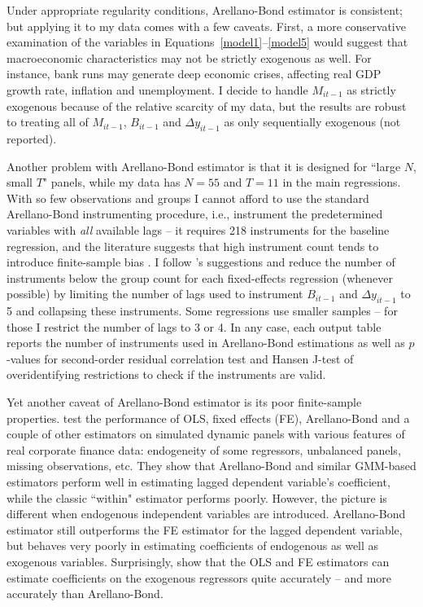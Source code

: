 \documentclass[12pt,a4paper]{article}
\begin{document}
Under appropriate regularity conditions, Arellano-Bond estimator is consistent; but applying it to my data comes with a few caveats. First, a more conservative examination of the variables in Equations~\eqref{model1}--\eqref{model5} would suggest that macroeconomic characteristics may not be strictly exogenous as well. For instance, bank runs may generate deep economic crises, affecting real GDP growth rate, inflation and unemployment. I decide to handle $M_{it-1}$ as strictly exogenous because of the relative scarcity of my data, but the results are robust to treating all of $M_{it-1}$, $B_{it-1}$ and $\Delta y_{it-1}$ as only sequentially exogenous (not reported).

Another problem with Arellano-Bond estimator is that it is designed for ``large $N$, small $T$" panels, while my data has $N = 55$ and $T = 11$ in the main regressions. With so few observations and groups I cannot afford to use the standard Arellano-Bond instrumenting procedure, i.e., instrument the predetermined variables with \emph{all} available lags -- it requires 218 instruments for the baseline regression, and the literature suggests that high instrument count tends to introduce finite-sample bias \citep{windmeijer2005finite, roodman2009note}. I follow \citet{roodman2009m}'s suggestions and reduce the number of instruments below the group count for each fixed-effects regression (whenever possible) by limiting the number of lags used to instrument $B_{it-1}$ and $\Delta y_{it-1}$ to 5 and collapsing these instruments. Some regressions use smaller samples -- for those I restrict the number of lags to 3 or 4. In any case, each output table reports the number of instruments used in Arellano-Bond estimations as well as $p$-values for second-order residual correlation test and Hansen J-test of overidentifying restrictions to check if the instruments are valid.

Yet another caveat of Arellano-Bond estimator is its poor finite-sample properties. \citet{flannery2013estimating} test the performance of OLS, fixed effects (FE), Arellano-Bond and a couple of other estimators on simulated dynamic panels with various features of real corporate finance data: endogeneity of some regressors, unbalanced panels, missing observations, etc. They show that Arellano-Bond and similar GMM-based estimators perform well in estimating lagged dependent variable's coefficient, while the classic ``within" estimator performs poorly. However, the picture is different when endogenous independent variables are introduced. Arellano-Bond estimator still outperforms the FE estimator for the lagged dependent variable, but behaves very poorly in estimating coefficients of endogenous as well as exogenous variables. Surprisingly, \citet{flannery2013estimating} show that the OLS and FE estimators can estimate coefficients on the exogenous regressors quite accurately -- and more accurately than Arellano-Bond.
\end{document}
